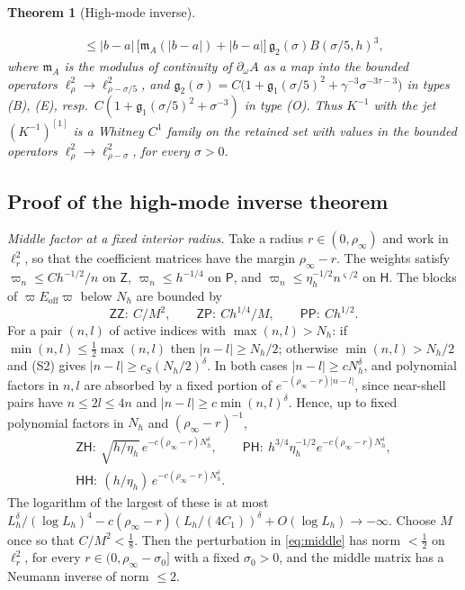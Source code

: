 \documentclass[11pt]{amsart}
\numberwithin{equation}{section}
\newtheorem{theorem}{Theorem}[section]
\theoremstyle{definition}
\theoremstyle{remark}
\newcommand{\abs}[1]{\lvert #1\rvert}
\begin{document}
\begin{theorem}[High-mode inverse]
\begin{enumerate}[label=\textup{(\roman*)}]
\begin{multline}
\le\abs{b-a}\,\bigl[\mathfrak m_A(\abs{b-a})+\abs{b-a}\bigr]\,\mathfrak g_2(\sigma)B(\sigma/5,h)^3,
\end{multline}
where $\mathfrak m_A$ is the modulus of continuity of $\partial_\omega A$ as a map into the bounded operators $\ell^2_\rho\to\ell^2_{\rho-\sigma/5}$, and $\mathfrak g_2(\sigma)=C\bigl(1+\mathfrak g_1(\sigma/5)^2+\gamma^{-3}\sigma^{-3\tau-3}\bigr)$ in types (B), (E), resp.\ $C(1+\mathfrak g_1(\sigma/5)^2+\sigma^{-3})$ in type (O). Thus $K^{-1}$ with the jet $(K^{-1})^{[1]}$ is a Whitney $C^1$ family on the retained set with values in the bounded operators $\ell^2_\rho\to\ell^2_{\rho-\sigma}$, for every $\sigma>0$.
\end{enumerate}
\end{theorem}

\subsection{Proof of the high-mode inverse theorem}
\emph{Middle factor at a fixed interior radius.} Take a radius $r\in(0,\rho_\infty)$ and work in $\ell^2_r$, so that the coefficient matrices have the margin $\rho_\infty-r$. The weights satisfy $\varpi_n\le Ch^{-1/2}/n$ on $\mathsf Z$, $\varpi_n\le h^{-1/4}$ on $\mathsf P$, and $\varpi_n\le\eta_h^{-1/2}n^{\varsigma/2}$ on $\mathsf H$. The blocks of $\varpi E_{\mathrm{off}}\varpi$ below $N_h$ are bounded by
\[
\mathsf{ZZ}:\ C/M^2,\qquad\mathsf{ZP}:\ Ch^{1/4}/M,\qquad\mathsf{PP}:\ Ch^{1/2}.
\]
For a pair $(n,l)$ of active indices with $\max(n,l)>N_h$: if $\min(n,l)\le\frac12\max(n,l)$ then $\abs{n-l}\ge N_h/2$; otherwise $\min(n,l)>N_h/2$ and (S2) gives $\abs{n-l}\ge c_S(N_h/2)^\delta$. In both cases $\abs{n-l}\ge cN_h^\delta$, and polynomial factors in $n,l$ are absorbed by a fixed portion of $e^{-(\rho_\infty-r)\abs{n-l}}$, since near-shell pairs have $n\le2l\le4n$ and $\abs{n-l}\ge c\min(n,l)^\delta$. Hence, up to fixed polynomial factors in $N_h$ and $(\rho_\infty-r)^{-1}$,
\begin{equation}\label{eq:HHblocks}
\begin{gathered}
\mathsf{ZH}:\ \sqrt{h/\eta_h}\,e^{-c(\rho_\infty-r)N_h^\delta},\qquad\mathsf{PH}:\ h^{3/4}\eta_h^{-1/2}e^{-c(\rho_\infty-r)N_h^\delta},\\
\mathsf{HH}:\ (h/\eta_h)\,e^{-c(\rho_\infty-r)N_h^\delta}.
\end{gathered}
\end{equation}
The logarithm of the largest of these is at most $L_h^\delta/(\log L_h)^4-c(\rho_\infty-r)(L_h/(4C_1))^\delta+O(\log L_h)\to-\infty$. Choose $M$ once so that $C/M^2<\frac18$. Then the perturbation in \eqref{eq:middle} has norm $<\frac12$ on $\ell^2_r$, for every $r\in(0,\rho_\infty-\sigma_0]$ with a fixed $\sigma_0>0$, and the middle matrix has a Neumann inverse of norm $\le2$.
\end{document}
